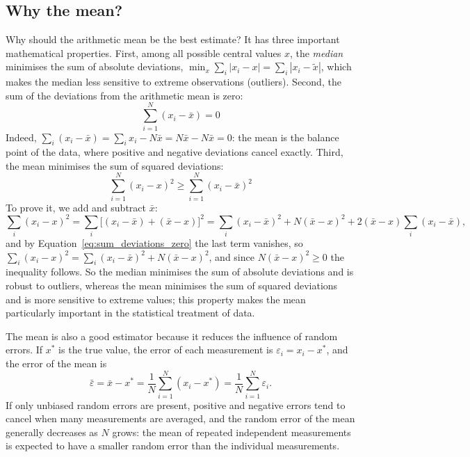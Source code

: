 \documentclass[letterpaper,11pt,leqno]{book}
\begin{document}
\subsection{Why the mean?}

Why should the arithmetic mean be the best estimate? It has three important mathematical properties. First, among all possible central values $x$, the \emph{median} minimises the sum of absolute deviations, $\min_x\sum_i|x_i - x| = \sum_i|x_i - \tilde{x}|$, which makes the median less sensitive to extreme observations (outliers). Second, the sum of the deviations from the arithmetic mean is zero:
\begin{equation}
\boxed{\sum_{i=1}^{N}(x_i - \bar{x}) = 0}
\label{eq:sum_deviations_zero}
\end{equation}
Indeed, $\sum_i(x_i - \bar{x}) = \sum_i x_i - N\bar{x} = N\bar{x} - N\bar{x} = 0$: the mean is the balance point of the data, where positive and negative deviations cancel exactly. Third, the mean minimises the sum of squared deviations:
\begin{equation}
\boxed{\sum_{i=1}^{N}(x_i - x)^2 \ge \sum_{i=1}^{N}(x_i - \bar{x})^2}
\label{eq:mean_least_squares}
\end{equation}
To prove it, we add and subtract $\bar{x}$:
\begin{equation*}
\sum_i(x_i - x)^2 = \sum_i\big[(x_i - \bar{x}) + (\bar{x} - x)\big]^2 = \sum_i(x_i - \bar{x})^2 + N(\bar{x} - x)^2 + 2(\bar{x} - x)\sum_i(x_i - \bar{x}),
\end{equation*}
and by Equation~\eqref{eq:sum_deviations_zero} the last term vanishes, so $\sum_i(x_i - x)^2 = \sum_i(x_i - \bar{x})^2 + N(\bar{x} - x)^2$, and since $N(\bar{x} - x)^2 \ge 0$ the inequality follows. So the median minimises the sum of absolute deviations and is robust to outliers, whereas the mean minimises the sum of squared deviations and is more sensitive to extreme values; this property makes the mean particularly important in the statistical treatment of data.

The mean is also a good estimator because it reduces the influence of random errors. If $x^*$ is the true value, the error of each measurement is $\varepsilon_i = x_i - x^*$, and the error of the mean is
\begin{equation}
\bar{\varepsilon} = \bar{x} - x^* = \frac{1}{N}\sum_{i=1}^{N}(x_i - x^*) = \frac{1}{N}\sum_{i=1}^{N}\varepsilon_i.
\end{equation}
If only unbiased random errors are present, positive and negative errors tend to cancel when many measurements are averaged, and the random error of the mean generally decreases as $N$ grows: the mean of repeated independent measurements is expected to have a smaller random error than the individual measurements.
\end{document}
